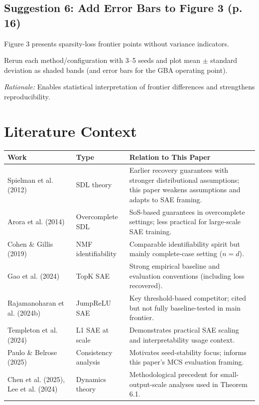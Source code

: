 \documentclass[11pt,a4paper]{article}
\begin{document}
\subsection*{Suggestion 6: Add Error Bars to Figure 3 (p. 16)}
\begin{originaltext}
Figure 3 presents sparsity-loss frontier points without variance indicators.
\end{originaltext}
\begin{revisedtext}
Rerun each method/configuration with 3--5 seeds and plot mean $\pm$ standard deviation as shaded bands (and error bars for the GBA operating point).
\end{revisedtext}
\textit{Rationale:} Enables statistical interpretation of frontier differences and strengthens reproducibility.

\section{Literature Context}
\begin{tabularx}{\textwidth}{p{3.4cm}p{2.1cm}X}
\toprule
\textbf{Work} & \textbf{Type} & \textbf{Relation to This Paper} \\
\midrule
Spielman et al. (2012) & SDL theory & Earlier recovery guarantees with stronger distributional assumptions; this paper weakens assumptions and adapts to SAE framing. \\
Arora et al. (2014) & Overcomplete SDL & SoS-based guarantees in overcomplete settings; less practical for large-scale SAE training. \\
Cohen \& Gillis (2019) & NMF identifiability & Comparable identifiability spirit but mainly complete-case setting ($n=d$). \\
Gao et al. (2024) & TopK SAE & Strong empirical baseline and evaluation conventions (including loss recovered). \\
Rajamanoharan et al. (2024b) & JumpReLU SAE & Key threshold-based competitor; cited but not fully baseline-tested in main frontier. \\
Templeton et al. (2024) & L1 SAE at scale & Demonstrates practical SAE scaling and interpretability usage context. \\
Paulo \& Belrose (2025) & Consistency analysis & Motivates seed-stability focus; informs this paper's MCS evaluation framing. \\
Chen et al. (2025), Lee et al. (2024) & Dynamics theory & Methodological precedent for small-output-scale analyses used in Theorem 6.1.
\\
\bottomrule
\end{tabularx}
\end{document}
